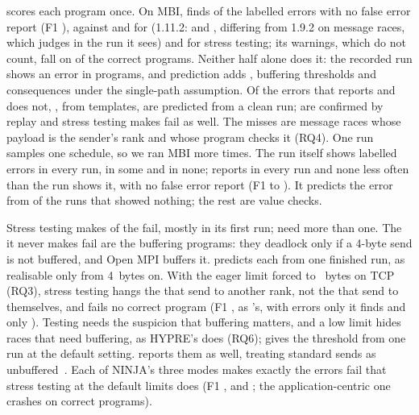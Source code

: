  scores each program once. On MBI, \tool finds \nMBItpunion of the \nMBIerrors labelled errors
with no false error report (F1 \MBIfoneunion), against \MBIfoneMUST and \MBIfoneMUSTsym for
\MUST (1.11.2: \MBIfoneMUSTeleven and \MBIfoneMUSTelevensym, differing from 1.9.2 on message
races, which \MUST judges in the run it sees) and \MBIfonestress for stress testing; its warnings, which do not count, fall on
\nMBIcorrectWarned of the \nMBIcorrect correct programs. Neither half alone does it: the
recorded run shows an error in \nMBItpobserved programs, and prediction adds \nMBItpPredOnly,
\nMBItpPredBuf buffering thresholds and \nMBItpPredSP consequences under the single-path
assumption. Of the \nMBIOnlyStretto errors that \tool reports and \MUST does not,
\nMBICleanPred, from \nMBICleanTemplates templates, are predicted from a clean run;
\nMBICleanConfirmed are confirmed by replay and stress testing makes \nMBICleanPredStress fail
as well. The \nMBIfnunion misses
are message races whose payload is the sender's rank and whose program checks it (RQ4).
One run samples one schedule, so we ran MBI \nRepsRuns more times. The run itself shows
\nRepsObsAlways labelled errors in every run, \nRepsObsSometimes in some and \nRepsObsNever in
none; \tool reports \nRepsUnionAlways in every run and none less often than the run shows it,
with no false error report (F1 \RepsUnionFoneMin to \RepsUnionFoneMax). It predicts the error
from \nRepsCleanPredicted of the \nRepsCleanRuns runs that showed nothing; the rest are value
checks.

Stress testing makes \nMBIStressFound of the \nMBIStressErr fail, mostly in its first run;
\nMBIStressLater need more than one. The \nMBIStressPredMissed it never makes fail are the
buffering programs: they deadlock only if a 4-byte send is not buffered, and Open MPI buffers
it. \tool predicts each from one finished run, as realisable only from 4~bytes on. With the
eager limit forced to \nMBIStressEagerBytes~bytes on TCP (RQ3), stress testing hangs the
\nMBIStressEagerBufFound that send to another rank, not the \nMBIStressEagerPredMissedSelf that
send to themselves, and fails no correct program (F1 \MBIfonestresseager, as \tool's, with
\nMBIStressEagerOnlyStress errors only it finds and \nMBIStressEagerOnlyStretto only \tool). Testing needs the
suspicion that buffering matters, and a low limit hides races that need buffering, as HYPRE's does
(RQ6); \tool gives the threshold from one run at the
default setting. \MUST reports them as well, treating standard sends as
unbuffered~\citep{hilbrich12must}. Each of NINJA's three modes makes exactly the errors fail
that stress testing at the default limits does (F1 \NinjaMBIRandomfone, \NinjaMBISystemfone and
\NinjaMBIAppfone; the application-centric one crashes on \nNinjaMBIAppFP correct programs).

